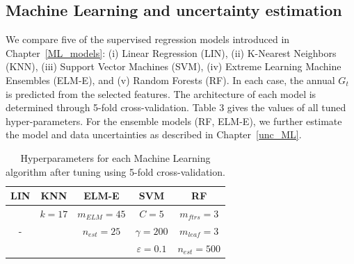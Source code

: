\subsection{Machine Learning and uncertainty estimation}
\label{chile_ml}

We compare five of the supervised regression models introduced in Chapter~\ref{ML_models}: (i) Linear Regression (LIN), (ii) K-Nearest Neighbors (KNN), (iii) Support Vector Machines (SVM), (iv) Extreme Learning Machine Ensembles (ELM-E), and (v) Random Forests (RF). In each case, the annual $G_t$ is predicted from the selected features. The architecture of each model is determined through 5-fold cross-validation. Table 3 gives the values of all tuned hyper-parameters. 
For the ensemble models (RF, ELM-E), we further estimate the model and data uncertainties as described in Chapter~\ref{unc_ML}.

\begin{table}[tb]
\centering
\footnotesize
\caption{Hyperparameters for each Machine Learning algorithm after tuning using 5-fold cross-validation.}
\label{tab:chile_hyperparams}
\begin{tabular}{ccccc}
\hline
\textbf{LIN}       & \textbf{KNN}      & \textbf{ELM-E}     & \textbf{SVM}     & \textbf{RF}         \\\hline
\multirow{3}{*}{-} & $k = 17$   & $m_{ELM} = 45$ & $C = 5 $  & $m_{ftrs} = 3$  \\
                   & \multirow{2}{*}{} & $n_{est} = 25$ &  $\gamma = 200$ & $m_{leaf} = 3$  \\
                   &                   &                    & $\varepsilon = 0.1$ & $n_{est} = 500$\\
\hline
\end{tabular}
\end{table}


